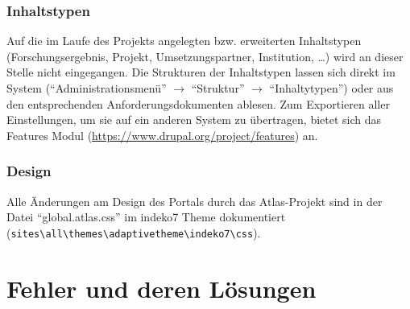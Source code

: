 \subsubsection{Inhaltstypen}\label{subsub:inhaltstypen}
Auf die im Laufe des Projekts angelegten bzw. erweiterten Inhaltstypen (Forschungsergebnis, Projekt, Umsetzungspartner, Institution, \dots) wird an dieser Stelle nicht eingegangen. Die Strukturen der Inhaltstypen lassen sich direkt im System (\enquote{Administrationsmenü} $\rightarrow$ \enquote{Struktur} $\rightarrow$  \enquote{Inhaltytypen}) oder aus den entsprechenden Anforderungsdokumenten ablesen. Zum Exportieren aller Einstellungen, um sie auf ein anderen System zu übertragen, bietet sich \zB das Features Modul (\url{https://www.drupal.org/project/features}) an. 




\subsubsection{Design}\label{subsub:cssdesign}
Alle Änderungen am Design des Portals durch das Atlas-Projekt sind in der Datei \enquote{global.atlas.css} im indeko7 Theme dokumentiert (\lstinline|sites\all\themes\adaptivetheme\indeko7\css|).




\newpage
\section{Fehler und deren Lösungen}\label{sec:problems}

